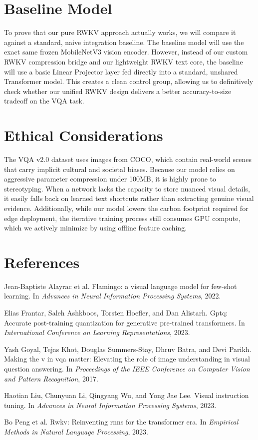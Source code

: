 \documentclass[final]{article}
\begin{document}
\section*{Baseline Model}

To prove that our pure RWKV approach actually works, we will compare it against a standard,
naive integration baseline. The baseline model will use the exact same frozen MobileNetV3
vision encoder. However, instead of our custom RWKV compression bridge and our lightweight RWKV
text core, the baseline will use a basic Linear Projector layer fed directly into a standard,
unshared Transformer model. This creates a clean control group, allowing us to definitively
check whether our unified RWKV design delivers a better accuracy-to-size tradeoff on the VQA
task.

\section*{Ethical Considerations}

The VQA v2.0 dataset uses images from COCO, which contain real-world scenes that carry implicit
cultural and societal biases. Because our model relies on aggressive parameter compression
under 100MB, it is highly prone to stereotyping. When a network lacks the capacity to store
nuanced visual details, it easily falls back on learned text shortcuts rather than extracting
genuine visual evidence. Additionally, while our model lowers the carbon footprint required for
edge deployment, the iterative training process still consumes GPU compute, which we actively
minimize by using offline feature caching.

\newpage
\section*{References}
Jean-Baptiste Alayrac et al. Flamingo: a visual language model for few-shot learning. In
\emph{Advances in Neural Information Processing Systems}, 2022.

Elias Frantar, Saleh Ashkboos, Torsten Hoefler, and Dan Alistarh. Gptq: Accurate post-training
quantization for generative pre-trained transformers. In \emph{International Conference on
Learning Representations}, 2023.

Yash Goyal, Tejas Khot, Douglas Summers-Stay, Dhruv Batra, and Devi Parikh. Making the v in vqa
matter: Elevating the role of image understanding in visual question answering. In
\emph{Proceedings of the IEEE Conference on Computer Vision and Pattern Recognition}, 2017.

Haotian Liu, Chunyuan Li, Qingyang Wu, and Yong Jae Lee. Visual instruction tuning. In
\emph{Advances in Neural Information Processing Systems}, 2023.

Bo Peng et al. Rwkv: Reinventing rnns for the transformer era. In \emph{Empirical Methods in
Natural Language Processing}, 2023.
\end{document}
